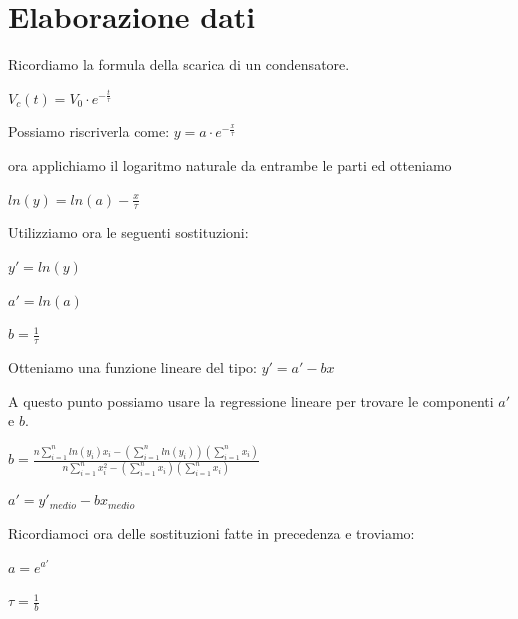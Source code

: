     \section{Elaborazione dati}
    Ricordiamo la formula della scarica di un condensatore. \par
    $V_c(t)=V_0 \cdot e^{-\frac{t}{\tau}}$ \par
    Possiamo riscriverla come: $y=a \cdot e^{-\frac{x}{\tau}}$ \par
    ora applichiamo il logaritmo naturale da entrambe le parti ed otteniamo \par
    $ln(y)=ln(a)-{\frac{x}{\tau}}$ \par
    Utilizziamo ora le seguenti sostituzioni: \par
    $y'=ln(y)$ \par
    $a'=ln(a)$ \par
    $b=\frac{1}{\tau}$ \par
    Otteniamo una funzione lineare del tipo: $y'=a'-bx$ \par
    A questo punto possiamo usare la regressione lineare per trovare le componenti $a'$ e $b$. \par
    $b=\frac{n\sum_{i = 1}^{n} ln(y_i)x_i - (\sum_{i = 1}^{n} ln(y_i))(\sum_{i = 1}^{n} x_i) }{n\sum_{i = 1}^{n} x_i^2 - (\sum_{i = 1}^{n} x_i)(\sum_{i = 1}^{n} x_i)}$ \par
    $a'=y'_{medio}-bx_{medio}$ \par
    Ricordiamoci ora delle sostituzioni fatte in precedenza e troviamo: \par
    $a=e^{a'}$ \par
    $\tau=\frac{1}{b}$ \par
    

